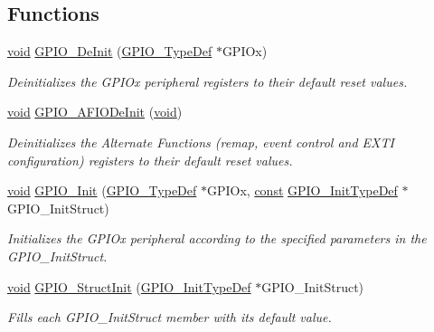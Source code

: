 \subsection*{Functions}
\begin{DoxyCompactItemize}
\item 
\hyperlink{group___n_a_m_e_ga18028b8badbf1ea7e704ccac3c488e82}{void} \hyperlink{group___g_p_i_o___private___functions_gaa60bdf3182c44b5fa818f237042f52ee}{G\-P\-I\-O\-\_\-\-De\-Init} (\hyperlink{struct_g_p_i_o___type_def}{G\-P\-I\-O\-\_\-\-Type\-Def} $\ast$G\-P\-I\-Ox)
\begin{DoxyCompactList}\small\item\em Deinitializes the G\-P\-I\-Ox peripheral registers to their default reset values. \end{DoxyCompactList}\item 
\hyperlink{group___n_a_m_e_ga18028b8badbf1ea7e704ccac3c488e82}{void} \hyperlink{group___g_p_i_o___private___functions_ga7f645e6b6146818c3d6c19021e70170c}{G\-P\-I\-O\-\_\-\-A\-F\-I\-O\-De\-Init} (\hyperlink{group___n_a_m_e_ga18028b8badbf1ea7e704ccac3c488e82}{void})
\begin{DoxyCompactList}\small\item\em Deinitializes the Alternate Functions (remap, event control and E\-X\-T\-I configuration) registers to their default reset values. \end{DoxyCompactList}\item 
\hyperlink{group___n_a_m_e_ga18028b8badbf1ea7e704ccac3c488e82}{void} \hyperlink{group___g_p_i_o___private___functions_gacadddd71fbb06165d8e9bb54b42031ff}{G\-P\-I\-O\-\_\-\-Init} (\hyperlink{struct_g_p_i_o___type_def}{G\-P\-I\-O\-\_\-\-Type\-Def} $\ast$G\-P\-I\-Ox, \hyperlink{group___n_a_m_e_ga7ae6d0e43244213b34de2c2b9aa30da6}{const} \hyperlink{struct_g_p_i_o___init_type_def}{G\-P\-I\-O\-\_\-\-Init\-Type\-Def} $\ast$G\-P\-I\-O\-\_\-\-Init\-Struct)
\begin{DoxyCompactList}\small\item\em Initializes the G\-P\-I\-Ox peripheral according to the specified parameters in the G\-P\-I\-O\-\_\-\-Init\-Struct. \end{DoxyCompactList}\item 
\hyperlink{group___n_a_m_e_ga18028b8badbf1ea7e704ccac3c488e82}{void} \hyperlink{group___g_p_i_o___private___functions_gab28de41278e7f8c63d0851e2733b10df}{G\-P\-I\-O\-\_\-\-Struct\-Init} (\hyperlink{struct_g_p_i_o___init_type_def}{G\-P\-I\-O\-\_\-\-Init\-Type\-Def} $\ast$G\-P\-I\-O\-\_\-\-Init\-Struct)
\begin{DoxyCompactList}\small\item\em Fills each G\-P\-I\-O\-\_\-\-Init\-Struct member with its default value. \end{DoxyCompactList}\item 

\end{DoxyCompactItemize}
